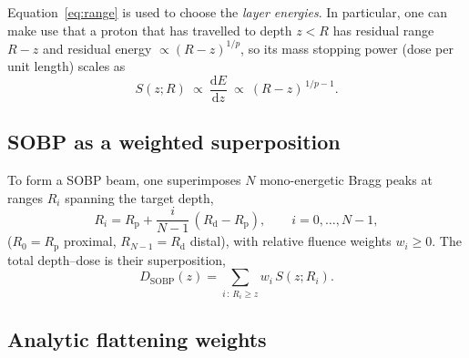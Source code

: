 \documentclass[11pt]{article}
\newcommand{\Rd}{R_{\mathrm d}}
\newcommand{\Rp}{R_{\mathrm p}}
\begin{document}
Equation~\eqref{eq:range} is used  to choose the \emph{layer energies}.
In particular, one can make use that 
a proton that has travelled to
depth $z<R$ has residual range $R-z$ and residual energy
$\propto (R-z)^{1/p}$, so its mass stopping power (dose per unit length) scales as
\begin{equation}
S(z;R)\ \propto\ \frac{\mathrm dE}{\mathrm dz}\ \propto\ (R-z)^{\,1/p-1}.
\label{eq:stop}
\end{equation}

\subsection{SOBP as a weighted superposition}

To form a SOBP beam, one superimposes 
$N$ mono-energetic Bragg peaks at ranges $R_i$ spanning the target depth,
\begin{equation}
R_i = \Rp + \frac{i}{N-1}\,(\Rd-\Rp),\qquad i=0,\dots,N-1,
\end{equation}
($R_0=\Rp$ proximal, $R_{N-1}=\Rd$ distal), with relative fluence weights
$w_i\ge0$. The total depth--dose is their superposition,
\begin{equation}
D_{\mathrm{SOBP}}(z)=\sum_{i\,:\,R_i\ge z} w_i\,S(z;R_i).
\label{eq:super}
\end{equation}


\subsection{Analytic flattening weights}
\label{sec:weights}
\end{document}
